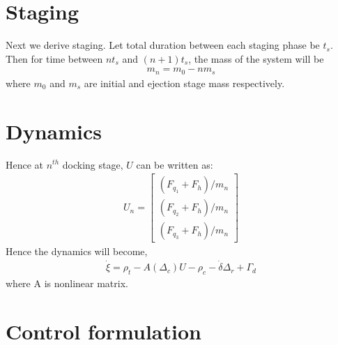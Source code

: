 \documentclass[]{article}
\theoremstyle{remark}
\theoremstyle{definition}
\begin{document}
	\section{Staging}
	Next we derive staging. Let total duration between each staging phase be $t_s$. Then for time between $nt_s$ and $(n+1)t_s$, the mass of the system will be 
	\begin{align}
		m_n = m_0 - nm_s 
	\end{align}
	where $m_0$ and $m_s$ are initial and ejection stage mass respectively.
	\section{Dynamics}
	Hence at $n^{th}$ docking stage, $U$ can be written as:
	\begin{align}
		U_n = \begin{bmatrix}
			(F_{q_1}+F_h)/m_n \\ (F_{q_2}+F_h)/m_n \\
			(F_{q_3}+F_h)/m_n
		\end{bmatrix}
	\end{align}
	Hence the dynamics will become,
	\begin{align}
		\dot \xi =  \rho_t -  A(\Delta_c)U-\rho_c - \dot \delta \Delta_r + \Gamma_d   
	\end{align}
	where A is nonlinear matrix. 
	\section{Control formulation}
\end{document}
